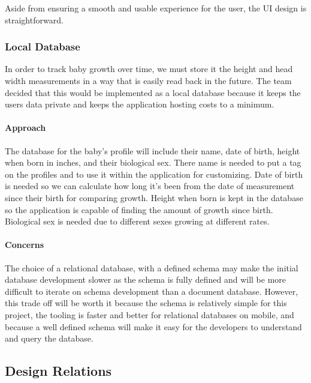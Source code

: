 \documentclass[onecolumn, draftclsnofoot,10pt, compsoc]{IEEEtran}
\begin{document}
Aside from ensuring a smooth and usable experience for the user, the UI design is straightforward.

\subsubsection{Local Database}

In order to track baby growth over time, we must store it the height and head width measurements in a way that is easily read back in the future. The team decided that this would be implemented as a local database because it keeps the users data private and keeps the application hosting costs to a minimum.\\

\paragraph{Approach}

The database for the baby's profile will include their name, date of birth, height when born in inches, and their biological sex. There name is needed to put a tag on the profiles and to use it within the application for customizing. Date of birth is needed so we can calculate how long it's been from the date of measurement since their birth for comparing growth. Height when born is kept in the database so the application is capable of finding the amount of growth since birth. Biological sex is needed due to different sexes growing at different rates. \\

\paragraph{Concerns}

The choice of a relational database, with a defined schema may make the initial database development slower as the schema is fully defined and will be more difficult to iterate on schema development than a document database. However, this trade off will be worth it because the schema is relatively simple for this project, the tooling is faster and better for relational databases on mobile, and because a well defined schema will make it easy for the developers to understand and query the database.\\

\subsection{Design Relations}
\end{document}
